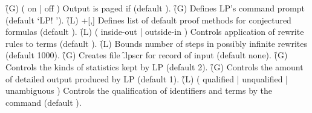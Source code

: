\begin{description}
\dt \f{(G)  ( on | off )}
\dd
Output is paged if  (default ).
\dt \f{(G)  }
\dd
Defines LP's command prompt (default \f{`LP! '}).
\dt \f{(L)  +[,]}
\dd
Defines list of default proof methods  for conjectured formulas (default
).
\dt \f{(L)  ( inside-out | outside-in )}
\dd
Controls application of rewrite rules to terms (default ).
\dt \f{(L)  }
\dd
Bounds number of steps in possibly infinite rewrites (default 1000).
\dt \f{(G)  }
\dd
Creates file \f{.lpscr} for record of input (default none).
\dt \f{(G)  }
\dd
Controls the kinds of statistics kept by LP (default 2).
\dt \f{(G)  }
\dd
Controls the amount of detailed output produced by LP (default 1).
\dt \f{(L)  ( qualified | unqualified | unambiguous )}
\dd 
Controls the qualification of identifiers and terms by the  command
(default ).
\end{description}
